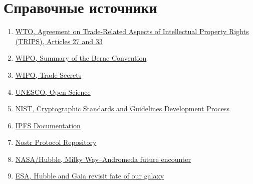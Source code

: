 \documentclass[11pt,a4paper]{article}
\begin{document}
\section*{Справочные источники}
\begin{enumerate}
  \item \href{https://www.wto.org/english/docs_e/legal_e/27-trips_04c_e.htm}{WTO, Agreement on Trade-Related Aspects of Intellectual Property Rights (TRIPS), Articles 27 and 33}
  \item \href{https://www.wipo.int/en/web/treaties/ip/berne/summary_berne}{WIPO, Summary of the Berne Convention}
  \item \href{https://www.wipo.int/en/web/trade-secrets}{WIPO, Trade Secrets}
  \item \href{https://www.unesco.org/en/open-science}{UNESCO, Open Science}
  \item \href{https://csrc.nist.gov/projects/crypto-standards-development-process}{NIST, Cryptographic Standards and Guidelines Development Process}
  \item \href{https://docs.ipfs.tech/}{IPFS Documentation}
  \item \href{https://github.com/nostr-protocol/nostr/}{Nostr Protocol Repository}
  \item \href{https://science.nasa.gov/missions/hubble/nasas-hubble-shows-milky-way-is-destined-for-head-on-collision-with-andromeda-galaxy/}{NASA/Hubble, Milky Way--Andromeda future encounter}
  \item \href{https://www.esa.int/Science_Exploration/Space_Science/Hubble_and_Gaia_revisit_fate_of_our_galaxy}{ESA, Hubble and Gaia revisit fate of our galaxy}
\end{enumerate}
\end{document}
